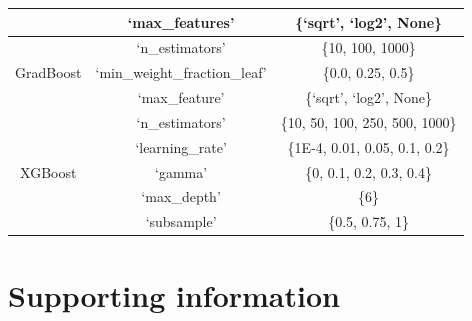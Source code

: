\documentclass[10pt,aps,prb,amsmath,amssymb,twocolumn,letterpaper,nobalancelastpage,final,citeautoscript,floatfix,raggedbottom,superscriptaddress]{revtex4-1}
\begin{document}
\begin{table}[t]
\begin{ruledtabular}
\begin{tabular}{ccc}
& `max\_features' & \{`sqrt', `log2', None\} \\
\hline
& `n\_estimators' &  \{10, 100, 1000\}\\
GradBoost & `min\_weight\_fraction\_leaf' &  \{0.0, 0.25, 0.5\}\\
& `max\_feature' &  \{`sqrt', `log2', None\}\\
\hline
& `n\_estimators' &  \{10, 50, 100, 250, 500, 1000\}\\
& `learning\_rate' &  \{1E-4, 0.01, 0.05, 0.1, 0.2\}\\
XGBoost & `gamma' &  \{0, 0.1, 0.2, 0.3, 0.4\}\\
& `max\_depth' &  \{6\}\\
& `subsample' &  \{0.5, 0.75, 1\}\\
\end{tabular}
\end{ruledtabular}
\end{table}

\clearpage

\section{Supporting information}
\end{document}
